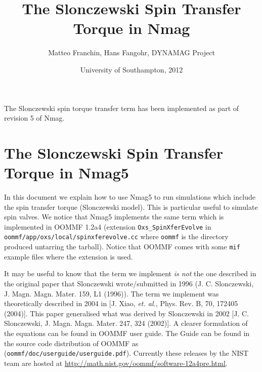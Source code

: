 \documentclass[11pt,oneside,openany]{article}
\begin{document}
\title{The Slonczewski Spin Transfer Torque in Nmag}
\author{Matteo Franchin, Hans Fangohr, DYNAMAG Project}
\date{University of Southampton, 2012}

\maketitle

The Slonczewski spin torque transfer term has been implemented as part of revision 5 of Nmag.

\section{The Slonczewski Spin Transfer Torque in Nmag5}
In this document we explain how to use Nmag5 to run simulations which
include the spin transfer torque (Slonczewski model). This is particular
useful to simulate spin valves. We notice that Nmag5 implements the same
term which is implemented in OOMMF 1.2a4 (extension \verb|Oxs_SpinXferEvolve|
in \verb|oommf/app/oxs/local/spinxferevolve.cc| where \verb|oommf| is the
directory produced untarring the tarball). Notice that OOMMF comes with some
\verb|mif| example files where the extension is used.

It may be useful to know that the term we implement \emph{is not} the one
described in the original paper that Slonczewski wrote/submitted in 1996
(J. C. Slonczewski, J. Magn. Magn. Mater. 159, L1 (1996)).
The term we implement was theoretically described in 2004
in [J. Xiao, \emph{et. al.}, Phys. Rev. B, 70, 172405 (2004)].
This paper generalised what was derived by Slonczewski in 2002
[J. C. Slonczewski, J. Magn. Magn. Mater. 247, 324 (2002)].
A clearer formulation of the equations can be found in OOMMF user guide. The Guide can be found in the source code distribution of OOMMF as (\verb|oommf/doc/userguide/userguide.pdf|). Currently these releases by the NIST team are hosted at \href{http://math.nist.gov/oommf/software-12a4pre.html}{http://math.nist.gov/oommf/software-12a4pre.html}.
\end{document}
